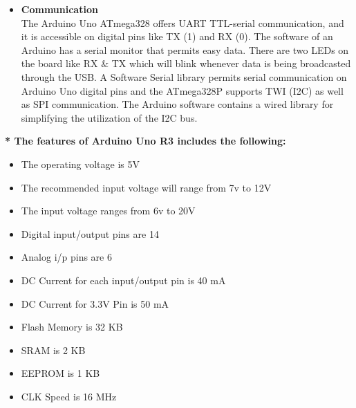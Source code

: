 	\begin{itemize}
		\item \textbf{Communication} \\ The Arduino Uno ATmega328 offers UART TTL-serial communication, and it is accessible on digital pins like TX (1) and RX (0). The software of an Arduino has a serial monitor that permits easy data. There are two LEDs on the board like RX $\&$ TX which will blink whenever data is being broadcasted through the USB. A Software Serial library permits serial communication on Arduino Uno digital pins and the ATmega328P supports TWI (I2C) as well as SPI communication. The Arduino software contains a wired library for simplifying the utilization of the I2C bus. 
	
	\end{itemize}

	\textbf{* The features of Arduino Uno R3 includes the following:}
	
	\begin{itemize}
		\item The operating voltage is 5V
	
		\item  The recommended input voltage will range from 7v to 12V
	
		\item  The input voltage ranges from 6v to 20V
	
		\item  Digital input/output pins are 14
	
		\item  Analog i/p pins are 6
	
		\item  DC Current for each input/output pin is 40 mA
	
		\item  DC Current for 3.3V Pin is 50 mA
	
		\item  Flash Memory is 32 KB
	
		\item  SRAM is 2 KB
	
		\item  EEPROM is 1 KB
	
		\item CLK Speed is 16 MHz
	
	\end{itemize}

	\newpage
